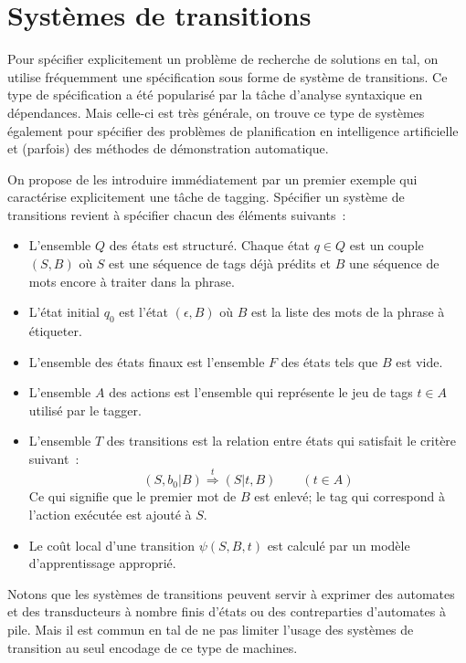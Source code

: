\documentclass[11pt,openany]{book}
\newcommand{\ac}[1]{{\sc #1}} %
\begin{document}
\section{Systèmes de transitions}

Pour spécifier explicitement un problème de recherche de solutions en \ac{tal}, on utilise fréquemment une spécification sous forme de système de transitions. Ce type de spécification a été popularisé par la tâche d'analyse syntaxique en dépendances.  Mais celle-ci est très générale, on trouve ce type de systèmes également pour spécifier des problèmes de planification en intelligence artificielle et (parfois) des méthodes de démonstration automatique. 

On propose de les introduire immédiatement par un premier exemple qui caractérise explicitement une tâche de tagging. Spécifier un système de transitions revient à spécifier chacun des éléments suivants~:
\begin{itemize}
\item L'ensemble $Q$ des états est structuré. Chaque état $q\in Q$ est un couple $(S,B)$ où $S$ est une séquence de tags déjà prédits et $B$ une séquence de mots encore à traiter dans la phrase. 
\item L'état initial $q_0$ est l'état $(\epsilon , B)$ où $B$ est la liste des mots de la phrase à étiqueter.
\item L'ensemble des états finaux est l'ensemble $F$ des états tels que $B$ est vide. 
\item L'ensemble $A$ des actions est l'ensemble qui représente le jeu de tags $t\in A$ utilisé par le tagger.
\item L'ensemble $T$ des transitions est la relation
entre états qui satisfait le critère suivant~: 
\begin{displaymath}
(S,b_0|B) \stackrel{t}{\Rightarrow}(S|t,B)\qquad (t \in A)
\end{displaymath}
Ce qui signifie que le premier mot de $B$ est enlevé; le tag qui correspond à l'action exécutée est ajouté à $S$.
\item Le coût local d'une transition $\psi(S,B,t)$ est calculé par un modèle d'apprentissage approprié. 
\end{itemize}

Notons que les systèmes de transitions peuvent servir à exprimer des automates et des transducteurs à nombre finis d'états ou des contreparties d'automates à pile. Mais il est commun en \ac{tal} de ne pas limiter l'usage des systèmes de transition au seul encodage de ce type de machines.
\end{document}
